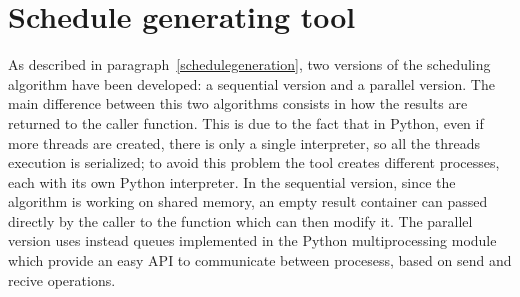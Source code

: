 \documentclass[a4paper,12pt,oneside]{book}
\begin{document}
\section{Schedule generating tool}

As described in paragraph~\ref{schedulegeneration}, two versions of the scheduling algorithm have been developed: a sequential version and a parallel version. The main difference between this two algorithms consists in how the results are returned to the caller function. This is due to the fact that in Python, even if more threads are created, there is only a single interpreter, so all the threads execution is serialized; to avoid this problem the tool creates different processes, each with its own Python interpreter. In the sequential version, since the algorithm is working on shared memory, an empty result container can passed directly by the caller to the function which can then modify it. The parallel version uses instead queues implemented in the Python multiprocessing module which provide an easy API to communicate between procesess, based on send and recive operations. 
\end{document}
